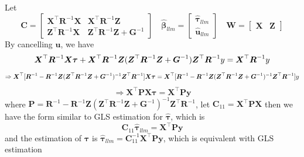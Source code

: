 \documentclass[
  a4paper,
  oneside,
  openany,
  12pt,
  onecolumn]{book}
\theoremstyle{plain}
\theoremstyle{definition}
\theoremstyle{remark}
\begin{document}
Let \[
\boldsymbol{C}=
\begin{bmatrix}
\boldsymbol{X}^\top\boldsymbol{R}^{-1}\boldsymbol{X} & \boldsymbol{X}^\top\boldsymbol{R}^{-1}\boldsymbol{Z}\\
\boldsymbol{Z}^\top\boldsymbol{R}^{-1}\boldsymbol{X} & \boldsymbol{Z}^\top\boldsymbol{R}^{-1}\boldsymbol{Z}+ \boldsymbol{G}^{-1}
\end{bmatrix} 
\quad
\hat{\boldsymbol{\beta}}_{llm}=\begin{bmatrix}
\hat{\boldsymbol{\tau}}_{llm}\\
\hat{\boldsymbol{u}}_{llm}
\end{bmatrix}
\quad
\boldsymbol{W}=\begin{bmatrix}\boldsymbol{X} &\boldsymbol{Z}\end{bmatrix}
\] By cancelling \(\boldsymbol{u}\), we have \[
\boldsymbol{X}^\top\boldsymbol{R}^{-1}\boldsymbol{X}\boldsymbol{\tau}+\boldsymbol{X}^\top\boldsymbol{R}^{-1}\boldsymbol{Z}(\boldsymbol{Z}^\top\boldsymbol{R}^{-1}\boldsymbol{Z}+\boldsymbol{G}^{-1})\boldsymbol{Z}^\top\boldsymbol{R}^{-1}y=\boldsymbol{X}^\top\boldsymbol{R}^{-1}y\\
\] \[
\Rightarrow \boldsymbol{X}^\top[\boldsymbol{R}^{-1}-\boldsymbol{R}^{-1}\boldsymbol{Z}(\boldsymbol{Z}^\top\boldsymbol{R}^{-1}\boldsymbol{Z}+\boldsymbol{G}^{-1})^{-1}\boldsymbol{Z}^\top\boldsymbol{R}^{-1}]\boldsymbol{X}\boldsymbol{\tau}=\boldsymbol{X}^\top[\boldsymbol{R}^{-1}-\boldsymbol{R}^{-1}\boldsymbol{Z}(\boldsymbol{Z}^\top\boldsymbol{R}^{-1}\boldsymbol{Z}+\boldsymbol{G}^{-1})^{-1}\boldsymbol{Z}^\top\boldsymbol{R}^{-1}]y\\
\] \[
\Rightarrow \boldsymbol{X}^\top\boldsymbol{P}\boldsymbol{X}\boldsymbol{\tau}=\boldsymbol{X}^\top\boldsymbol{P}\boldsymbol{y}
\] where
\(\boldsymbol{P}=\boldsymbol{R}^{-1}-\boldsymbol{R}^{-1}\boldsymbol{Z}(\boldsymbol{Z}^\top\boldsymbol{R}^{-1}\boldsymbol{Z}+\boldsymbol{G}^{-1})^{-1}\boldsymbol{Z}^\top\boldsymbol{R}^{-1}\),
let
\(\boldsymbol{C}_{11}=\boldsymbol{X}^\top\boldsymbol{P}\boldsymbol{X}\)
then we have the form similar to GLS estimation for
\(\hat{\boldsymbol{\tau}}\), which is \[
\boldsymbol{C}_{11}\hat{\boldsymbol{\tau}}_{llm}=\boldsymbol{X}^\top\boldsymbol{P}\boldsymbol{y}
\] and the estimation of \(\boldsymbol{\tau}\) is
\(\hat{\boldsymbol{\tau}}_{llm}=\boldsymbol{C}_{11}^{-1}\boldsymbol{X}^\top\boldsymbol{P}\boldsymbol{y}\),
which is equivalent with GLS estimation
\end{document}
